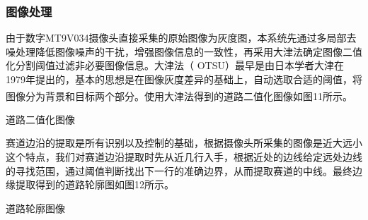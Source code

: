 \documentclass{article}%
\begin{document}
\begin{multicols}{2}
		\subsubsection{图像处理}
		由于数字MT9V034摄像头直接采集的原始图像为灰度图，本系统先通过多局部去噪处理降低图像噪声的干扰，增强图像信息的一致性，再采用大津法确定图像二值化分割阈值过滤非必要图像信息。大津法（ OTSU）最早是由日本学者大津在1979年提出的，基本的思想是在图像灰度差异的基础上，自动选取合适的阈值，将图像分为背景和目标两个部分\textsuperscript{\cite{ref6}}。使用大津法得到的道路二值化图像如图11所示。
		\begin{center}
			\caption{道路二值化图像}		
		\end{center}
		
		赛道边沿的提取是所有识别以及控制的基础，根据摄像头所采集的图像是近大远小这个特点，我们对赛道边沿提取时先从近几行入手，根据近处的边线给定远处边线的寻找范围，通过阈值判断找出下一行的准确边界，从而提取赛道的中线。最终边缘提取得到的道路轮廓图如图12所示。
		\begin{center}
			\caption{道路轮廓图像}		
		\end{center}
		

\end{multicols}
\end{document}
